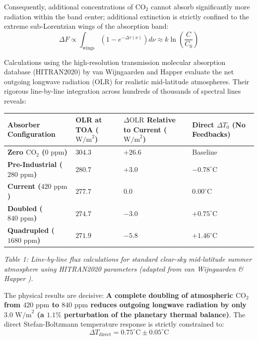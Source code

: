 \documentclass[10pt,twocolumn]{article}
\begin{document}
Consequently, additional concentrations of $\text{CO}_2$ cannot absorb significantly more radiation within the band center; additional extinction is strictly confined to the extreme sub-Lorentzian wings of the absorption band:
\begin{equation}
  \Delta F \propto \int_{\text{wings}} \left(1 - e^{-\Delta \tau(\nu)}\right) d\nu \approx k \ln\left(\frac{C}{C_0}\right)
\end{equation}

Calculations using the high-resolution transmission molecular absorption database (HITRAN2020) by van Wijngaarden and Happer \cite{WijngaardenHapper2020} evaluate the net outgoing longwave radiation (OLR) for realistic mid-latitude atmospheres. Their rigorous line-by-line integration across hundreds of thousands of spectral lines reveals:

\begin{table}[htbp]
\centering
\small
\begin{tabular}{llll}
\toprule
Absorber Configuration & OLR at TOA ($\text{W/m}^2$) & $\Delta \text{OLR}$ Relative to Current ($\text{W/m}^2$) & Direct $\Delta T_0$ (No Feedbacks) \\
\midrule
\textbf{Zero $\text{CO}_2$ ($0\text{ ppm}$)} & $304.3$ & $+26.6$ & Baseline \\
\textbf{Pre-Industrial ($280\text{ ppm}$)} & $280.7$ & $+3.0$ & $-0.78^\circ\text{C}$ \\
\textbf{Current ($420\text{ ppm}$)} & $277.7$ & $0.0$ & $0.00^\circ\text{C}$ \\
\textbf{Doubled ($840\text{ ppm}$)} & $274.7$ & $-3.0$ & $+0.75^\circ\text{C}$ \\
\textbf{Quadrupled ($1680\text{ ppm}$)} & $271.9$ & $-5.8$ & $+1.46^\circ\text{C}$ \\
\bottomrule
\end{tabular}
\end{table}

\textit{Table 1: Line-by-line flux calculations for standard clear-sky mid-latitude summer atmosphere using HITRAN2020 parameters (adapted from van Wijngaarden & Happer \cite{WijngaardenHapper2020}).}

The physical results are decisive: \textbf{A complete doubling of atmospheric $\text{CO}_2$ from $420\text{ ppm}$ to $840\text{ ppm}$ reduces outgoing longwave radiation by only $3.0\text{ W/m}^2$ (a $1.1\%$ perturbation of the planetary thermal balance)}. The direct Stefan-Boltzmann temperature response is strictly constrained to:
\begin{equation}
  \boxed{\Delta T_{\text{direct}} = 0.75^\circ\text{C} \pm 0.05^\circ\text{C}}
\end{equation}
\end{document}
